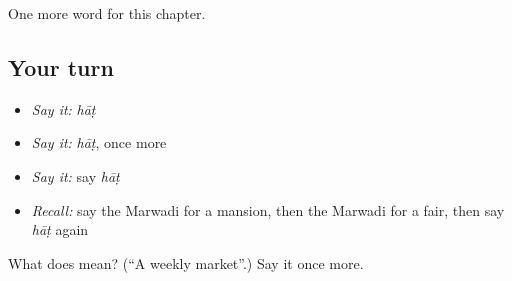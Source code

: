 \begin{grammarlens}[title={What you've built}]
One more word for this chapter.
\end{grammarlens}

\subsection*{Your turn}
\begin{itemize}
\raggedright
  \item \emph{Say it:} \emph{hāṭ}
  \item \emph{Say it:} \emph{hāṭ}, once more
  \item \emph{Say it:} say \emph{hāṭ}
  \item \emph{Recall:} say the Marwadi for a mansion, then the Marwadi for a fair, then say \emph{hāṭ} again
\end{itemize}

\begin{tcolorbox}[breakable,colback=teal!4,colframe=teal!35!black,title={Before you move on}]
What does  mean? (\textquotedblleft{}A weekly market\textquotedblright{}.) Say it once more.
\end{tcolorbox}
